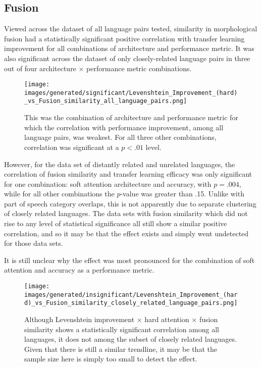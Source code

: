 \subsection{Fusion}

Viewed across the dataset of all language pairs tested, similarity in morphological fusion had a statistically significant positive correlation with transfer learning improvement for all combinations of architecture and performance metric. It was also significant across the dataset of only closely-related language pairs in three out of four architecture $\times$ performance metric combinations.

\begin{figure}[ht]
\texttt{[image: images/generated/significant/Levenshtein\_Improvement\_(hard)\_vs\_Fusion\_similarity\_all\_language\_pairs.png]}
\centering
\caption{This was the combination of architecture and performance metric for which the correlation with performance improvement, among all language pairs, was weakest. For all three other combinations, correlation was significant at a $p<.01$ level.}
\end{figure}

However, for the data set of distantly related and unrelated languages, the correlation of fusion similarity and transfer learning efficacy was only significant for one combination: soft attention architecture and accuracy, with $p=.004$, while for all other combinations the $p$-value was greater than .15. Unlike with part of speech category overlaps, this is not apparently due to separate clustering of closely related languages. The data sets with fusion similarity which did not rise to any level of statistical significance all still show a similar positive correlation, and so it may be that the effect exists and simply went undetected for those data sets. 

It is still unclear why the effect was most pronounced for the combination of soft attention and accuracy as a performance metric.

\begin{figure}[ht]
\texttt{[image: images/generated/insignificant/Levenshtein\_Improvement\_(hard)\_vs\_Fusion\_similarity\_closely\_related\_language\_pairs.png]}
\centering
\caption{Although Levenshtein improvement $\times$ hard attention $\times$ fusion similarity shows a statistically significant correlation among all languages, it does not among the subset of closely related languages. Given that there is still a similar trendline, it may be that the sample size here is simply too small to detect the effect.}
\end{figure}


